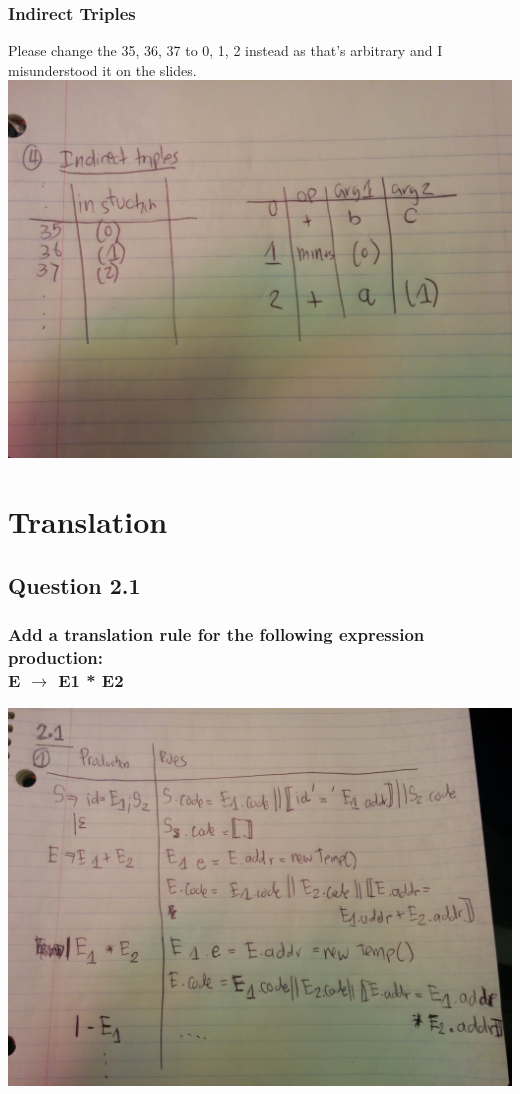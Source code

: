 \documentclass[11pt, oneside]{article}   	%
\begin{document}
\subsubsection{Indirect Triples}
\par Please change the 35, 36, 37 to 0, 1, 2 instead as that's arbitrary and I misunderstood it on the slides. \\
\includegraphics[scale=0.15]{IMG_20141029_001005.jpg}

\newpage

\section{Translation}

\subsection{Question 2.1}

\subsubsection{Add a translation rule for the following expression production: \\ E $\rightarrow$ E1 * E2}
\includegraphics[scale=0.15]{IMG_20141029_003207.jpg}
\end{document}
